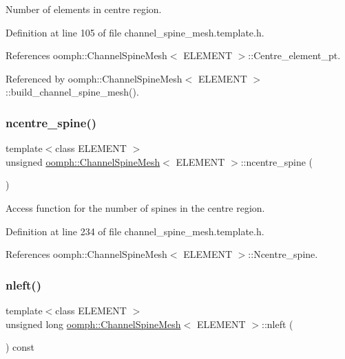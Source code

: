 Number of elements in centre region. 



Definition at line 105 of file channel\+\_\+spine\+\_\+mesh.\+template.\+h.



References oomph\+::\+Channel\+Spine\+Mesh$<$ E\+L\+E\+M\+E\+N\+T $>$\+::\+Centre\+\_\+element\+\_\+pt.



Referenced by oomph\+::\+Channel\+Spine\+Mesh$<$ E\+L\+E\+M\+E\+N\+T $>$\+::build\+\_\+channel\+\_\+spine\+\_\+mesh().

\mbox{\label{classoomph_1_1ChannelSpineMesh_a85fa0910148e6aa5d8a1995ece5feeae}} 
\subsubsection{\texorpdfstring{ncentre\+\_\+spine()}{ncentre\_spine()}}
{\footnotesize\ttfamily template$<$class E\+L\+E\+M\+E\+NT $>$ \\
unsigned \hyperlink{classoomph_1_1ChannelSpineMesh}{oomph\+::\+Channel\+Spine\+Mesh}$<$ E\+L\+E\+M\+E\+NT $>$\+::ncentre\+\_\+spine (\begin{DoxyParamCaption}{ }\end{DoxyParamCaption})\hspace{0.3cm}{\ttfamily [inline]}}



Access function for the number of spines in the centre region. 



Definition at line 234 of file channel\+\_\+spine\+\_\+mesh.\+template.\+h.



References oomph\+::\+Channel\+Spine\+Mesh$<$ E\+L\+E\+M\+E\+N\+T $>$\+::\+Ncentre\+\_\+spine.

\mbox{\label{classoomph_1_1ChannelSpineMesh_a6f7b8f540855876e49b5f1c3f0214d9a}} 
\subsubsection{\texorpdfstring{nleft()}{nleft()}}
{\footnotesize\ttfamily template$<$class E\+L\+E\+M\+E\+NT $>$ \\
unsigned long \hyperlink{classoomph_1_1ChannelSpineMesh}{oomph\+::\+Channel\+Spine\+Mesh}$<$ E\+L\+E\+M\+E\+NT $>$\+::nleft (\begin{DoxyParamCaption}{ }\end{DoxyParamCaption}) const\hspace{0.3cm}{\ttfamily [inline]}}



